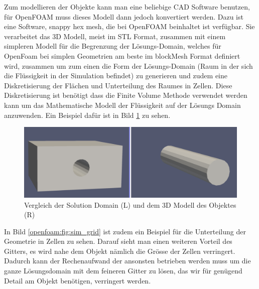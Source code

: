 Zum modellieren der Objekte kann man eine beliebige CAD Software benutzen, für OpenFOAM muss dieses Modell dann jedoch konvertiert werden.
Dazu ist eine Software, snappy hex  mesh, die bei OpenFOAM beinhaltet ist verfügbar.
Sie verarbeitet das 3D Modell, meist im STL Format, zusammen mit einem simpleren Modell für die Begrenzung der Lösungs-Domain, welches für OpenFoam bei simplen Geometrien am beste im blockMesh Format definiert wird, zusammen um zum einen die Form der Lösungs-Domain (Raum in der sich die Flüssigkeit in der Simulation befindet) zu generieren und zudem eine Diskretisierung der Flächen und Unterteilung des Raumes in Zellen.
Diese Diskretisierung ist benötigt dass die Finite Volume Methode verwendet werden kann um das Mathematische Modell der Flüssigkeit auf der Lösungs Domain anzuwenden.
Ein Beispiel dafür ist in Bild \ref{openfoam:fig:SD_Modell_vergleich} zu sehen.
\begin{figure}[h]
	\centering
	\includegraphics[scale=0.1]{papers/openfoam/Bilder/vergleich_solution_domain_object.png}
	\caption{Vergleich der Solution Domain (L) und dem 3D Modell des Objektes (R)}
	\label{openfoam:fig:SD_Modell_vergleich}
\end{figure}

In Bild \ref{openfoam:fig:sim_grid} ist zudem ein Beispiel für die Unterteilung der Geometrie in Zellen zu sehen.
Darauf sieht man einen weiteren Vorteil des Gitters, es wird nahe dem Objekt nämlich die Grösse der Zellen verringert.
Dadurch kann der Rechenaufwand der ansonsten betrieben werden muss um die ganze Lösungsdomain mit dem feineren Gitter zu lösen, das wir für genügend Detail am Objekt benötigen, verringert werden.

